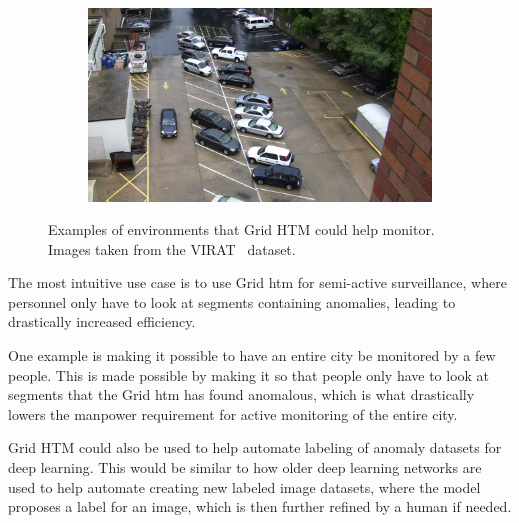 \begin{figure}[H]
\begin{subfigure}{0.49\linewidth}
    \end{subfigure}
    \begin{subfigure}{0.49\linewidth}
        \includegraphics[width=\linewidth]{resources/methodology/surveillance_example4.png}
    \end{subfigure}
    \caption[Grid HTM Environments]{Examples of environments that Grid HTM could help monitor. Images taken from the VIRAT~\cite{VIRAT} dataset.}
\end{figure}
The most intuitive use case is to use Grid \gls*{htm} for semi-active surveillance, where personnel only have to look at segments containing anomalies, leading to drastically increased efficiency.
\par
One example is making it possible to have an entire city be monitored by a few people. This is made possible by making it so that people only have to look at segments that the Grid \gls*{htm} has found anomalous, which is what drastically lowers the manpower requirement for active monitoring of the entire city.
\par
Grid HTM could also be used to help automate labeling of anomaly datasets for deep learning. This would be similar to how older deep learning networks are used to help automate creating new labeled image datasets, where the model proposes a label for an image, which is then further refined by a human if needed.
